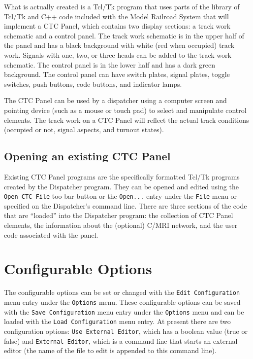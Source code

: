 What is actually created is a Tcl/Tk program that uses parts of the
library of Tcl/Tk and C++ code included with the Model Railroad System
that will implement a CTC Panel, which contains two display sections: a
track work schematic and a control panel.  The track work schematic is in
the upper half of the panel and has a black background with white (red
when occupied) track work. Signals with one, two, or three heads can be
added to the track work schematic.  The control panel is in the lower
half and has a dark green background. The control panel can have switch
plates, signal plates, toggle switches, push buttons, code buttons, and
indicator lamps.

The CTC Panel can be used by a dispatcher using a computer screen and
pointing device (such as a mouse or touch pad) to select and manipulate
control elements. The track work on a CTC Panel will reflect the actual
track conditions (occupied or not, signal aspects, and turnout states).

\subsection{Opening an existing CTC Panel}

Existing CTC Panel programs are the specifically formatted Tcl/Tk programs
created by the Dispatcher program.  They can be opened and edited using
the \verb=Open CTC File= too bar button or the \verb=Open...= entry under
the \verb=File= menu or specified on the Dispatcher's command line. 
There are three sections of the code that are ``loaded'' into the
Dispatcher program: the collection of CTC Panel elements, the
information about the (optional) C/MRI network, and the user code
associated with the panel.

\section{Configurable Options}
\label{sect:dispatcher:configopts}

The configurable options can be set or changed with the 
\verb=Edit Configuration= menu entry under the \verb=Options= menu. These
configurable options can be saved with the \verb=Save Configuration=
menu entry under the \verb=Options= menu and can be loaded with the 
\verb=Load Configuration= menu entry.  At present there are two
configuration options: \verb=Use External Editor=, which has a boolean
value (true or false) and \verb=External Editor=, which is a
command line that starts an external editor (the name of the file
to edit is appended to this command line).

